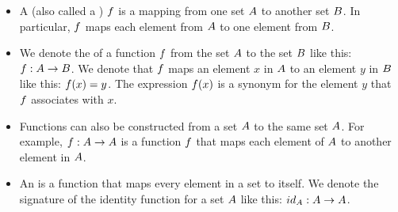 \documentclass[../../../main.tex]{subfiles}
\begin{document}
\begin{itemize}

  \item A  (also called a ) $f$ is a mapping from one set $A$ to another set $B$. In particular, $f$ maps each element from $A$ to one element from $B$. 
  
  \item We denote the  of a function $f$ from the set $A$ to the set $B$ like this: $f: A \rightarrow B$. We denote that $f$ maps an element $x$ in $A$ to an element $y$ in $B$ like this: $f(x) = y$. The expression $f(x)$ is a synonym for the element $y$ that $f$ associates with $x$. 
  
  \item Functions can also be constructed from a set $A$ to the same set $A$. For example, $f : A \rightarrow A$ is a function $f$ that maps each element of $A$ to another element in $A$.
  
  \item An  is a function that maps every element in a set to itself. We denote the signature of the identity function for a set $A$ like this: $id_{A} : A \rightarrow A$.   

\end{itemize}
\end{document}

